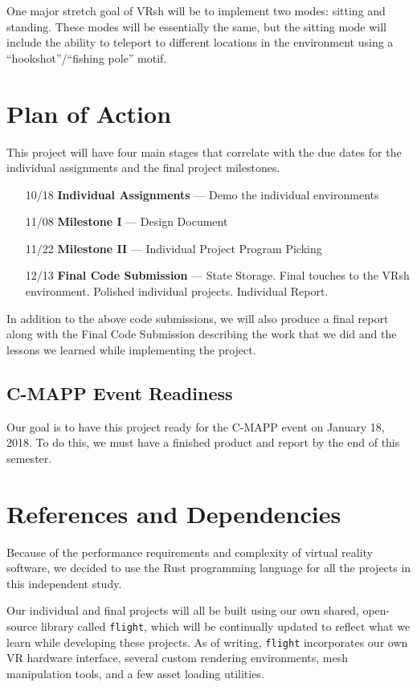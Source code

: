 \documentclass[titlepage,12pt]{article}
\begin{document}
One major stretch goal of VRsh will be to implement two modes: sitting and
standing. These modes will be essentially the same, but the sitting mode will
include the ability to teleport to different locations in the environment using
a ``hookshot''/``fishing pole'' motif.

\section{Plan of Action}

This project will have four main stages that correlate with the due dates for
the individual assignments and the final project milestones.

\begin{enumerate}[leftmargin=*]
    \item [10/18] \textbf{Individual Assignments} --- Demo the individual
        environments
    \item [11/08] \textbf{Milestone I} --- Design Document
    \item [11/22] \textbf{Milestone II} --- Individual Project Program Picking
    \item [12/13] \textbf{Final Code Submission} --- State Storage. Final touches 
    to the VRsh environment. Polished individual projects. Individual Report.
\end{enumerate}

In addition to the above code submissions, we will also produce a final report
along with the Final Code Submission describing the work that we did and the
lessons we learned while implementing the project.

\subsection{C-MAPP Event Readiness}
Our goal is to have this project ready for the C-MAPP event on January 18, 2018. To do
this, we must have a finished product and report by the end of this semester.

\section{References and Dependencies}

Because of the performance requirements and complexity of virtual reality
software, we decided to use the Rust programming language for all the projects
in this independent study.

Our individual and final projects will all be built using our own shared,
open-source library called \texttt{flight}, which will be continually updated to
reflect what we learn while developing these projects. As of writing,
\texttt{flight} incorporates our own VR hardware interface, several custom
rendering environments, mesh manipulation tools, and a few asset loading
utilities.
\end{document}
